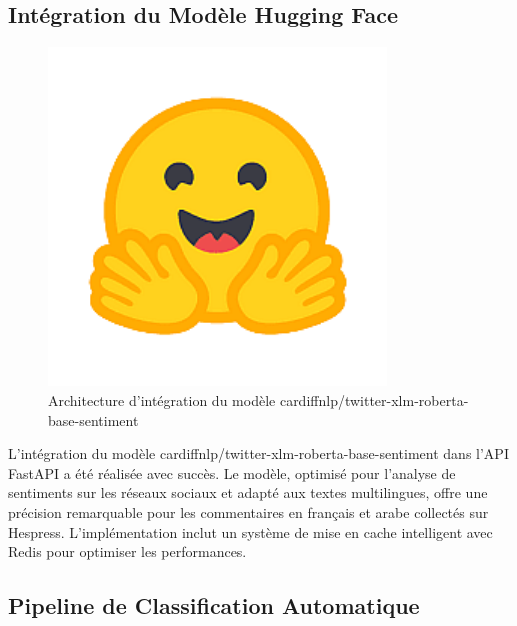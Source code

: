 \subsection{Intégration du Modèle Hugging Face}

\begin{figure}[H]
\centering
\includegraphics[width=0.8\textwidth]{assets/images/face.png}
\caption{Architecture d'intégration du modèle cardiffnlp/twitter-xlm-roberta-base-sentiment}
\label{fig:huggingface-integration}
\end{figure}

L'intégration du modèle cardiffnlp/twitter-xlm-roberta-base-sentiment dans l'API FastAPI a été réalisée avec succès. Le modèle, optimisé pour l'analyse de sentiments sur les réseaux sociaux et adapté aux textes multilingues, offre une précision remarquable pour les commentaires en français et arabe collectés sur Hespress. L'implémentation inclut un système de mise en cache intelligent avec Redis pour optimiser les performances.

\subsection{Pipeline de Classification Automatique}

